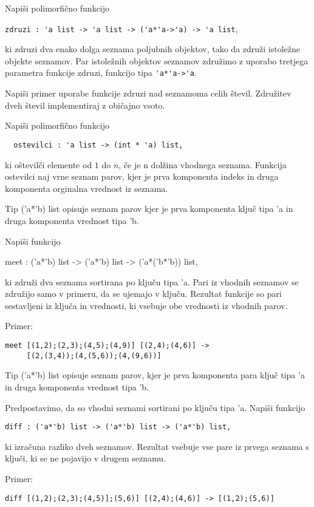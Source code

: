 \begin{ex}
Napi\v si polimorfi\v cno funkcijo 

\begin{center}
\lstinline{zdruzi : 'a list -> 'a list -> ('a*'a->'a) -> 'a list}, 
\end{center}

ki zdruzi dva enako dolga seznama poljubnih objektov, tako da zdru\v zi istole\v zne objekte seznamov. Par istole\v znih objektov seznamov zdru\v zimo z uporabo tretjega parametra funkcije zdruzi, funkcijo tipa \lstinline{'a*'a->'a}.

Napi\v si primer uporabe funkcije zdruzi nad seznamoma celih \v stevil. Zdru\v zitev dveh \v stevil implementiraj z obi\v cajno vsoto. 
\end{ex}
\begin{ex}
  Napi\v si polimorfi\v cno funkcijo
\begin{lstlisting}
  ostevilci : 'a list -> (int * 'a) list, 
\end{lstlisting}
  ki o\v stevil\v ci elemente od $1$ do $n$, \v ce je n dol\v zina
  vhodnega seznama. Funkcija ostevilci naj vrne seznam parov, kjer je
  prva komponenta indeks in druga komponenta orginalna vrednost iz
  seznama.

\end{ex} 
\begin{ex}
Tip ('a*'b) list opisuje seznam parov kjer je prva komponenta klju\v c tipa 'a in druga komponenta vrednost tipa 'b. 

Napi\v si funkcijo 

meet : ('a*'b) list -> ('a*'b) list -> ('a*('b*'b)) list,

ki zdru\v zi dva seznama sortirana po klju\v cu tipa 'a. Pari iz vhodnih seznamov se zdru\v zijo samo v primeru, da se ujemajo v klju\v cu. Rezultat funkcije so pari sestavljeni iz klju\v ca in vrednosti, ki vsebuje obe vrednosti iz vhodnih parov.  

Primer:    
\begin{lstlisting}
meet [(1,2);(2,3);(4,5);(4,9)] [(2,4);(4,6)] -> 
     [(2,(3,4));(4,(5,6));(4,(9,6))]
\end{lstlisting}


\end{ex} 
\begin{ex}
  Tip ('a*'b) list opisuje seznam parov, kjer je prva komponenta para
  klju\v c tipa 'a in druga komponenta vrednost tipa 'b.

  Predpostavimo, da so vhodni seznami sortirani po klju\v cu tipa
  'a. Napi\v si funkcijo

\begin{lstlisting}
diff : ('a*'b) list -> ('a*'b) list -> ('a*'b) list,
\end{lstlisting}

  ki izra\v cuna razliko dveh seznamov. Rezultat vsebuje vse pare iz
  prvega seznama s klju\v ci, ki se ne pojavijo v drugem seznamu.

\noindent\/Primer:    
\begin{lstlisting}
diff [(1,2);(2,3);(4,5)];(5,6)] [(2,4);(4,6)] -> [(1,2);(5,6)]
\end{lstlisting}


\end{ex} 
